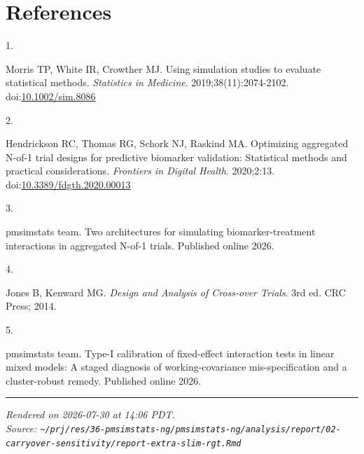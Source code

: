 \documentclass[
  11pt,
]{article}
\newlength{\cslhangindent}
\newlength{\csllabelwidth}
\newenvironment{CSLReferences}[2] %
 {\begin{list}{}{%
  \setlength{\itemindent}{0pt}
  \setlength{\leftmargin}{0pt}
  \setlength{\parsep}{0pt}
  \ifodd #1
   \setlength{\leftmargin}{\cslhangindent}
   \setlength{\itemindent}{-1\cslhangindent}
  \fi
  \setlength{\itemsep}{#2\baselineskip}}}
 {\end{list}}
\newcommand{\CSLLeftMargin}[1]{\parbox[t]{\csllabelwidth}{\strut#1\strut}}
\newcommand{\CSLRightInline}[1]{\parbox[t]{\linewidth - \csllabelwidth}{\strut#1\strut}}
\begin{document}
\section{References}\label{references}

\protect{}\label{refs}
\begin{CSLReferences}{0}{1}
\CSLLeftMargin{1. }%
\CSLRightInline{Morris TP, White IR, Crowther MJ. Using simulation studies to evaluate statistical methods. \emph{Statistics in Medicine}. 2019;38(11):2074-2102. doi:\href{https://doi.org/10.1002/sim.8086}{10.1002/sim.8086}}

\CSLLeftMargin{2. }%
\CSLRightInline{Hendrickson RC, Thomas RG, Schork NJ, Raskind MA. Optimizing aggregated {N}-of-1 trial designs for predictive biomarker validation: Statistical methods and practical considerations. \emph{Frontiers in Digital Health}. 2020;2:13. doi:\href{https://doi.org/10.3389/fdgth.2020.00013}{10.3389/fdgth.2020.00013}}

\CSLLeftMargin{3. }%
\CSLRightInline{{pmsimstats team}. Two architectures for simulating biomarker-treatment interactions in aggregated {N}-of-1 trials. Published online 2026.}

\CSLLeftMargin{4. }%
\CSLRightInline{Jones B, Kenward MG. \emph{Design and Analysis of Cross-over Trials}. 3rd ed. CRC Press; 2014.}

\CSLLeftMargin{5. }%
\CSLRightInline{{pmsimstats team}. Type-{I} calibration of fixed-effect interaction tests in linear mixed models: A staged diagnosis of working-covariance mis-specification and a cluster-robust remedy. Published online 2026.}

\end{CSLReferences}

\vfill

\begin{center}\rule{0.5\linewidth}{0.5pt}\end{center}

\emph{Rendered on 2026-07-30 at 14:06 PDT.}\\
\emph{Source: \texttt{\textasciitilde{}/prj/res/36-pmsimstats-ng/pmsimstats-ng/analysis/report/02-carryover-sensitivity/report-extra-slim-rgt.Rmd}}
\end{document}
